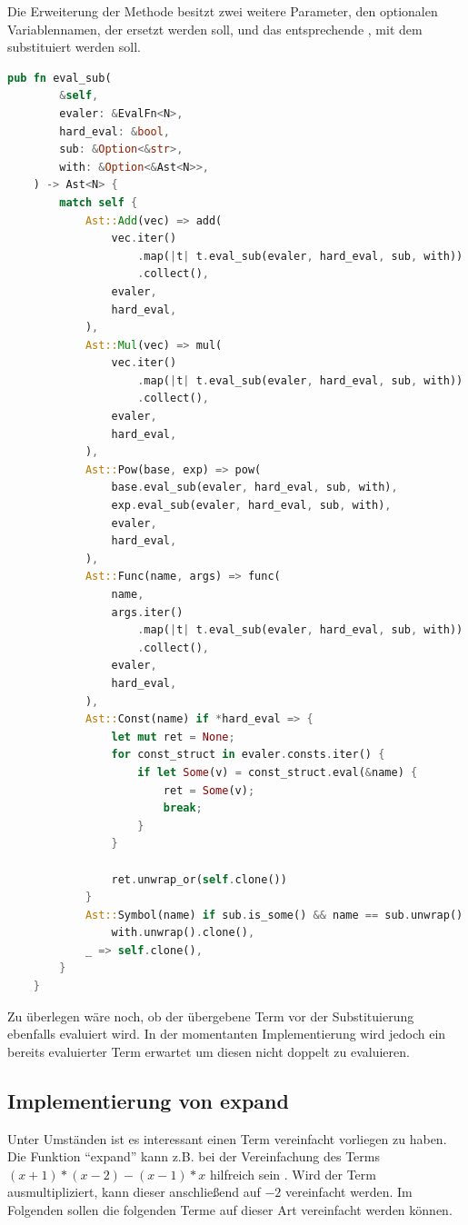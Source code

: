 \documentclass[11pt,a4paper, ngerman]{article}
\begin{document}
Die Erweiterung der Methode besitzt zwei weitere Parameter, den optionalen Variablennamen, der ersetzt werden soll, und das entsprechende , mit dem substituiert werden soll.
\begin{lstlisting}[language=rust, caption={Erweiterung pub fn eval}]
    pub fn eval_sub(
        &self,
        evaler: &EvalFn<N>,
        hard_eval: &bool,
        sub: &Option<&str>,
        with: &Option<&Ast<N>>,
    ) -> Ast<N> {
        match self {
            Ast::Add(vec) => add(
                vec.iter()
                    .map(|t| t.eval_sub(evaler, hard_eval, sub, with))
                    .collect(),
                evaler,
                hard_eval,
            ),
            Ast::Mul(vec) => mul(
                vec.iter()
                    .map(|t| t.eval_sub(evaler, hard_eval, sub, with))
                    .collect(),
                evaler,
                hard_eval,
            ),
            Ast::Pow(base, exp) => pow(
                base.eval_sub(evaler, hard_eval, sub, with),
                exp.eval_sub(evaler, hard_eval, sub, with),
                evaler,
                hard_eval,
            ),
            Ast::Func(name, args) => func(
                name,
                args.iter()
                    .map(|t| t.eval_sub(evaler, hard_eval, sub, with))
                    .collect(),
                evaler,
                hard_eval,
            ),
            Ast::Const(name) if *hard_eval => {
                let mut ret = None;
                for const_struct in evaler.consts.iter() {
                    if let Some(v) = const_struct.eval(&name) {
                        ret = Some(v);
                        break;
                    }
                }

                ret.unwrap_or(self.clone())
            }
            Ast::Symbol(name) if sub.is_some() && name == sub.unwrap() => 
                with.unwrap().clone(),
            _ => self.clone(),
        }
    }
\end{lstlisting}

Zu überlegen wäre noch, ob der übergebene Term vor der Substituierung ebenfalls evaluiert wird. In der momentanten Implementierung wird jedoch ein bereits evaluierter Term erwartet um diesen nicht doppelt zu evaluieren.

\subsection{Implementierung von expand}
Unter Umständen ist es interessant einen Term vereinfacht vorliegen zu haben. Die Funktion ``expand'' kann z.B. bei der Vereinfachung des Terms $(x + 1)*(x - 2) - (x - 1)*x$ hilfreich sein \cite{SymPyExpand}. Wird der Term ausmultipliziert, kann dieser anschließend auf $-2$ vereinfacht werden. Im Folgenden sollen die folgenden Terme auf dieser Art vereinfacht werden können.
\end{document}
